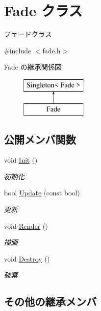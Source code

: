 \hypertarget{class_fade}{}\section{Fade クラス}
\label{class_fade}


フェードクラス  




{\ttfamily \#include $<$fade.\+h$>$}

Fade の継承関係図\begin{figure}[H]
\begin{center}
\leavevmode
\includegraphics[height=2.000000cm]{class_fade}
\end{center}
\end{figure}
\subsection*{公開メンバ関数}
\begin{DoxyCompactItemize}
\item 
void \mbox{\hyperlink{class_fade_ac2a47819e1390abcae3259bcb42bddf5}{Init}} ()
\begin{DoxyCompactList}\small\item\em 初期化 \end{DoxyCompactList}\item 
bool \mbox{\hyperlink{class_fade_aaf97d1ac502c86612a97fde0e2fbf308}{Update}} (const bool)
\begin{DoxyCompactList}\small\item\em 更新 \end{DoxyCompactList}\item 
void \mbox{\hyperlink{class_fade_abfe024be1a10d4849582adf58fe6682a}{Render}} ()
\begin{DoxyCompactList}\small\item\em 描画 \end{DoxyCompactList}\item 
void \mbox{\hyperlink{class_fade_afd5cce157c2876a800ea59b2648547c2}{Destroy}} ()
\begin{DoxyCompactList}\small\item\em 破棄 \end{DoxyCompactList}\end{DoxyCompactItemize}
\subsection*{その他の継承メンバ}


